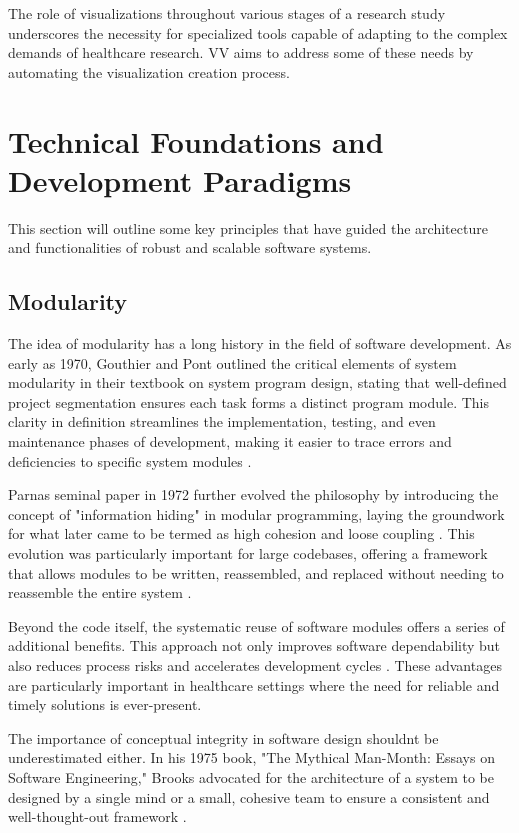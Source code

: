 The role of visualizations throughout various stages of a research study
underscores the necessity for specialized tools capable of adapting to
the complex demands of healthcare research. VV aims to address some of
these needs by automating the visualization creation process.

\section{Technical Foundations and Development
Paradigms}\label{technical-foundations-and-development-paradigms}

This section will outline some key principles that have guided the
architecture and functionalities of robust and scalable software
systems.

\subsection{Modularity}\label{modularity}

The idea of modularity has a long history in the field of software
development. As early as 1970, Gouthier and Pont outlined the critical
elements of system modularity in their textbook on system program
design, stating that well-defined project segmentation ensures each task
forms a distinct program module. This clarity in definition streamlines
the implementation, testing, and even maintenance phases of development,
making it easier to trace errors and deficiencies to specific system
modules \cite{16}.

Parnas\textquotesingle{} seminal paper in 1972 further evolved the
philosophy by introducing the concept of "information hiding" in modular
programming, laying the groundwork for what later came to be termed as
high cohesion and loose coupling
\cite{17}\cite{18}. This
evolution was particularly important for large codebases, offering a
framework that allows modules to be written, reassembled, and replaced
without needing to reassemble the entire system
\cite{17}.

Beyond the code itself, the systematic reuse of software modules offers
a series of additional benefits. This approach not only improves
software dependability but also reduces process risks and accelerates
development cycles
\cite{19}. These advantages
are particularly important in healthcare settings where the need for
reliable and timely solutions is ever-present.

The importance of conceptual integrity in software design
shouldn\textquotesingle t be underestimated either. In his 1975 book,
"The Mythical Man-Month: Essays on Software Engineering," Brooks
advocated for the architecture of a system to be designed by a single
mind or a small, cohesive team to ensure a consistent and
well-thought-out framework
\cite{20}.

